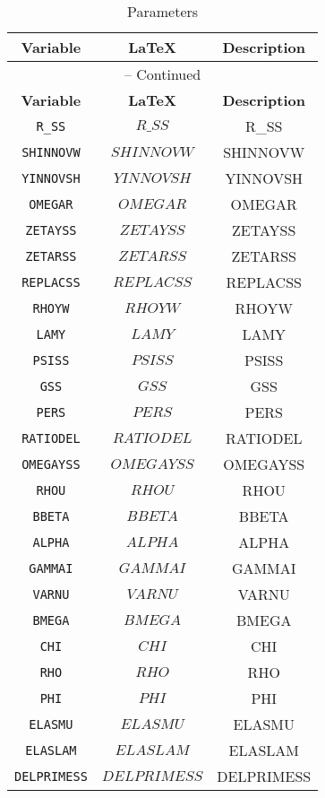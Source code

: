 \begin{center}
\begin{longtable}{ccc}
\caption{Parameters}\\%
\hline%
\multicolumn{1}{c}{\textbf{Variable}} &
\multicolumn{1}{c}{\textbf{\LaTeX}} &
\multicolumn{1}{c}{\textbf{Description}}\\%
\hline\hline%
\endfirsthead
\multicolumn{3}{c}{{\tablename} \thetable{} -- Continued}\\%
\hline%
\multicolumn{1}{c}{\textbf{Variable}} &
\multicolumn{1}{c}{\textbf{\LaTeX}} &
\multicolumn{1}{c}{\textbf{Description}}\\%
\hline\hline%
\endhead
\texttt{R\_SS} & $R\_SS$ & R\_SS\\
\texttt{SHINNOVW} & $SHINNOVW$ & SHINNOVW\\
\texttt{YINNOVSH} & $YINNOVSH$ & YINNOVSH\\
\texttt{OMEGAR} & $OMEGAR$ & OMEGAR\\
\texttt{ZETAYSS} & $ZETAYSS$ & ZETAYSS\\
\texttt{ZETARSS} & $ZETARSS$ & ZETARSS\\
\texttt{REPLACSS} & $REPLACSS$ & REPLACSS\\
\texttt{RHOYW} & $RHOYW$ & RHOYW\\
\texttt{LAMY} & $LAMY$ & LAMY\\
\texttt{PSISS} & $PSISS$ & PSISS\\
\texttt{GSS} & $GSS$ & GSS\\
\texttt{PERS} & $PERS$ & PERS\\
\texttt{RATIODEL} & $RATIODEL$ & RATIODEL\\
\texttt{OMEGAYSS} & $OMEGAYSS$ & OMEGAYSS\\
\texttt{RHOU} & $RHOU$ & RHOU\\
\texttt{BBETA} & $BBETA$ & BBETA\\
\texttt{ALPHA} & $ALPHA$ & ALPHA\\
\texttt{GAMMAI} & $GAMMAI$ & GAMMAI\\
\texttt{VARNU} & $VARNU$ & VARNU\\
\texttt{BMEGA} & $BMEGA$ & BMEGA\\
\texttt{CHI} & $CHI$ & CHI\\
\texttt{RHO} & $RHO$ & RHO\\
\texttt{PHI} & $PHI$ & PHI\\
\texttt{ELASMU} & $ELASMU$ & ELASMU\\
\texttt{ELASLAM} & $ELASLAM$ & ELASLAM\\
\texttt{DELPRIMESS} & $DELPRIMESS$ & DELPRIMESS\\

\end{longtable}
\end{center}
